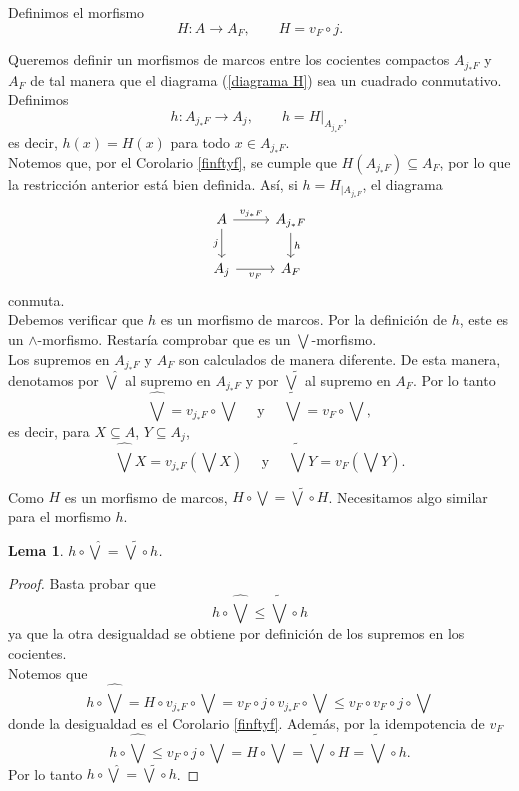 \documentclass[11pt]{amsart}
\theoremstyle{plain}
\newtheorem{lem}[thm]{Lema}
\theoremstyle{definition}
\begin{document}
Definimos el morfismo 
\[
H\colon A\to A_F, \qquad H=v_F\circ j.
\]

Queremos definir un morfismos de marcos entre los cocientes compactos $A_{j_*F}$ y $A_F$ de tal manera que 
el diagrama (\ref{diagrama H}) sea un cuadrado conmutativo.\\

Definimos
\[
h\colon A_{j_*F}\to A_j, \qquad h=H|_{A_{j_*F}},
\]
es decir, $h(x)=H(x)$ para todo $x\in A_{j_*F}$.\\

Notemos que, por el Corolario \ref{finftyf}, se cumple que $H(A_{j_*F})\subseteq A_F$, por lo que la restricción anterior 
está bien definida. Así, si $h=H_{\mid{A_{j_*F}}}$, el diagrama 
\[\begin{tikzcd}
	A & {A_{j_*F}} \\
	{A_j} & {A_F}
	\arrow["{v_{j_*F}}", from=1-1, to=1-2]
	\arrow["j"', from=1-1, to=2-1]
	\arrow["h", from=1-2, to=2-2]
	\arrow["{v_F}"', from=2-1, to=2-2]
\end{tikzcd}\]
conmuta.\\

Debemos verificar que $h$ es un morfismo de marcos. Por la definición de $h$, este es un $\wedge$-morfismo. Restaría comprobar que es un $\bigvee$-morfismo.\\

Los supremos en $A_{j_*F}$ y $A_F$ son calculados de manera diferente. De esta manera, denotamos por $\hat{\bigvee}$ al supremo en $A_{j_*F}$ y por $\tilde{\bigvee}$ al supremo en $A_F$. Por lo tanto
\[
\hat{\bigvee}=v_{j_*F}\circ \bigvee\quad\mbox{ y }\quad \tilde{\bigvee}=v_{F}\circ \bigvee,
\] 
es decir, para $X\subseteq A$, $Y\subseteq A_j$,
\[
	\hat{\bigvee}X=v_{j_*F}(\bigvee X)\quad\mbox{ y }\quad \tilde{\bigvee}Y=v_{F}(\bigvee Y).
\]

Como $H$ es un morfismo de marcos, $H\circ \bigvee=\tilde{\bigvee}\circ H$. Necesitamos algo similar para el morfismo $h$.

\begin{lem}\label{bigvee g}
$h\circ \hat{\bigvee}=\tilde{\bigvee}\circ h$.
\end{lem}

\begin{proof}
Basta probar que 
\[
h\circ \hat{\bigvee}\leq \tilde{\bigvee}\circ h
\]
ya que la otra desigualdad se obtiene por definición de los supremos en los cocientes.\\

Notemos que
\[
h\circ \hat{\bigvee}=H\circ v_{j_*F}\circ \bigvee=v_F\circ j\circ v_{j_*F}\circ \bigvee\leq v_F\circ v_F\circ j\circ \bigvee
\]
donde la desigualdad es el Corolario \ref{finftyf}. Además, por la idempotencia de $v_F$ 
\[
h\circ\hat{\bigvee}\leq v_F\circ j\circ \bigvee =H\circ \bigvee=\tilde{\bigvee}\circ H=\tilde{\bigvee}\circ h.
\]
Por lo tanto $h\circ\hat{\bigvee}=\tilde{\bigvee}\circ h$.
\end{proof}
\end{document}
